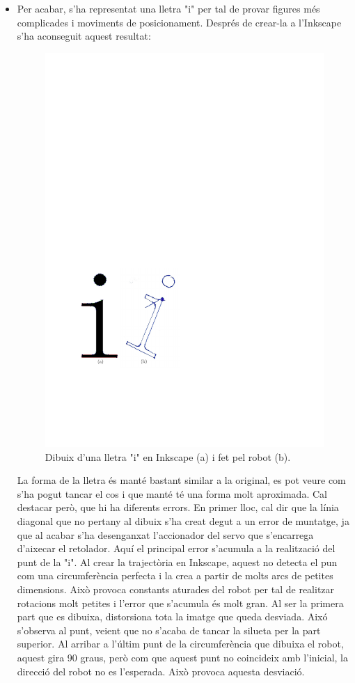 \begin{itemize}
	\item Per acabar, s'ha representat una lletra "i" per tal de provar figures més complicades i moviments de posicionament. Després de crear-la a l'Inkscape s'ha aconseguit aquest resultat:
	\begin{figure}[H]
		\centering
		\includegraphics{resultatLletra}
		\caption{Dibuix d'una lletra "i" en Inkscape (a) i fet pel robot (b).}
		\label{fig:Lletra}
	\end{figure}
	La forma de la lletra és manté bastant similar a la original, es pot veure com s'ha pogut tancar el cos i que manté té una forma molt aproximada. Cal destacar però, que hi ha diferents errors. En primer lloc, cal dir que la línia diagonal que no pertany al dibuix s'ha creat degut a un error de muntatge, ja que al acabar s'ha desenganxat l'accionador del servo que s'encarrega d'aixecar el retolador. Aquí el principal error s'acumula a la realització del punt de la "i". Al crear la trajectòria en Inkscape, aquest no detecta el pun com una circumferència perfecta i la crea a partir de molts arcs de petites dimensions. Això provoca constants aturades del robot per tal de realitzar rotacions molt petites i l'error que s'acumula és molt gran. Al ser la primera part que es dibuixa, distorsiona tota la imatge que queda desviada. Aixó s'observa al punt, veient que no s'acaba de tancar la silueta per la part superior. Al arribar a l'últim punt de la circumferència que dibuixa el robot, aquest gira 90 graus, però com que aquest punt no coincideix amb l'inicial, la direcció del robot no es l'esperada. Això provoca aquesta desviació. 
	

\end{itemize}
